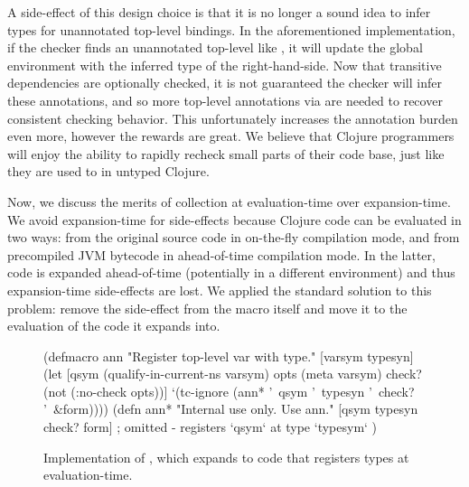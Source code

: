 A side-effect of this design choice is that it is no longer a sound idea to
infer types for unannotated top-level bindings. In the aforementioned 
implementation, if the checker finds an unannotated top-level 
like , it will update the global environment with the 
inferred type of the right-hand-side.
Now that transitive dependencies are optionally checked, it is not guaranteed
the checker will infer these annotations, and so more top-level annotations
via  are needed to recover consistent checking behavior.
This unfortunately increases the annotation burden even more, however the rewards
are great.
We believe that Clojure programmers will enjoy the ability to rapidly recheck
small parts of their code base, just like they are used to in untyped Clojure.

Now, we discuss the merits of collection at evaluation-time over expansion-time.
We avoid expansion-time for side-effects because Clojure code can be
evaluated in two ways: from the original source code in on-the-fly compilation mode, and 
from precompiled JVM bytecode in ahead-of-time compilation mode.
In the latter, code is expanded ahead-of-time (potentially in a different environment)
and thus expansion-time side-effects are lost.
We applied the standard solution to this problem: remove the side-effect from
the macro itself and move it to the evaluation of the code it expands into.




\begin{figure*}
\begin{cljlisting}
(defmacro ann 
  "Register top-level var with type."
  [varsym typesyn]
  (let [qsym (qualify-in-current-ns varsym)
        opts (meta varsym)
        check? (not (:no-check opts))]
    `(tc-ignore (ann* '~qsym '~typesyn '~check? '~&form))))
(defn ann* 
  "Internal use only. Use ann."
  [qsym typesyn check? form]
  ; omitted - registers `qsym` at type `typesym`
  )
\end{cljlisting}
  \caption{Implementation of , which expands to code that registers types at evaluation-time.}
  \label{fig:analyzer:ann-definition}
\end{figure*}

